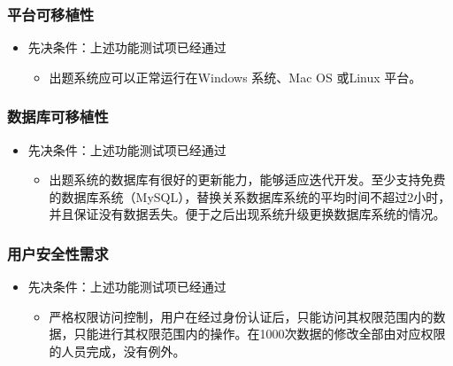 \documentclass[hyperref, a4paper]{ctexart}
\providecommand{\tightlist}{%
  \setlength{\itemsep}{0pt}\setlength{\parskip}{0pt}}
\begin{document}
\hypertarget{ux5e73ux53f0ux53efux79fbux690dux6027}{%
\subsubsection{平台可移植性}\label{ux5e73ux53f0ux53efux79fbux690dux6027}}

\begin{itemize}
\tightlist
\item
  先决条件：上述功能测试项已经通过

  \begin{itemize}
  \tightlist
  \item
    出题系统应可以正常运行在Windows 系统、Mac OS 或Linux 平台。
  \end{itemize}
\end{itemize}

\hypertarget{ux6570ux636eux5e93ux53efux79fbux690dux6027}{%
\subsubsection{数据库可移植性}\label{ux6570ux636eux5e93ux53efux79fbux690dux6027}}

\begin{itemize}
\tightlist
\item
  先决条件：上述功能测试项已经通过

  \begin{itemize}
  \tightlist
  \item
    出题系统的数据库有很好的更新能力，能够适应迭代开发。至少支持免费的数据库系统（MySQL），替换关系数据库系统的平均时间不超过2小时，并且保证没有数据丢失。便于之后出现系统升级更换数据库系统的情况。
  \end{itemize}
\end{itemize}

\hypertarget{ux7528ux6237ux5b89ux5168ux6027ux9700ux6c42}{%
\subsubsection{用户安全性需求}\label{ux7528ux6237ux5b89ux5168ux6027ux9700ux6c42}}

\begin{itemize}
\tightlist
\item
  先决条件：上述功能测试项已经通过

  \begin{itemize}
  \tightlist
  \item
    严格权限访问控制，用户在经过身份认证后，只能访问其权限范围内的数据，只能进行其权限范围内的操作。在1000次数据的修改全部由对应权限的人员完成，没有例外。
  \end{itemize}
\end{itemize}
\end{document}
